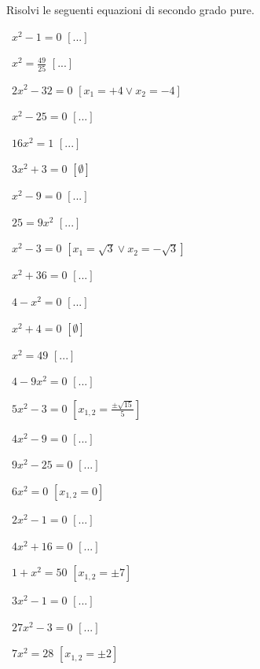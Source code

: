 \begin{esercizio}[\Ast]
 \label{ese:3.1}
Risolvi le seguenti equazioni di secondo grado pure.
\begin{multicols}{2}
 \begin{enumeratea}
 \item~$x^{2}-1 = 0$ \hfill$\left[...\right]$
 \item~$x^{2}=\frac{49}{25}$ \hfill$\left[...\right]$
 \item~$2x^{2} - 32 = 0$ \hfill$\left[x_{1}=+4 \vee x_{2}=-4\right]$
 \item~$x^{2}-25=0$ \hfill$\left[...\right]$
 \item~$16 x^{2}=1$ \hfill$\left[...\right]$
 \item~$3x^{2}+3=0$ \hfill$\left[\emptyset\right]$
 \item~$x^{2}-9=0$ \hfill$\left[...\right]$
 \item~$25=9 x^{2}$ \hfill$\left[...\right]$
 \item~$x^{2} - 3 = 0$ \hfill$\left[x_{1} = \sqrt{3} \vee x _{2} = - \sqrt{3}\right]$
 \item~$x^{2} + 36 = 0$ \hfill$\left[...\right]$
 \item~$4 - x^{2} = 0$ \hfill$\left[...\right]$
 \item~$x^{2} + 4 = 0$ \hfill$\left[\emptyset\right]$
 \item~$x^{2} = 49$ \hfill$\left[...\right]$
 \item~$4 - 9 x^{2} = 0$ \hfill$\left[...\right]$
 \item~$5 x^{2} - 3 = 0$ \hfill$\left[x_{1,2} = \frac{\pm \sqrt{15}}{5}\right]$
 \item~$4 x^{2} - 9 = 0$ \hfill$\left[...\right]$
 \item~$9 x^{2} - 25 = 0$ \hfill$\left[...\right]$
 \item~$6 x^{2} = 0$ \hfill$\left[x_{1,2} = 0\right]$
 \item~$2 x^{2} - 1 = 0$ \hfill$\left[...\right]$
 \item~$4 x^{2} + 16 = 0$ \hfill$\left[...\right]$
 \item~$1 + x^{2} = 50$ \hfill$\left[x_{1,2} = \pm 7\right]$
 \item~$3 x^{2} - 1 = 0$ \hfill$\left[...\right]$
 \item~$27 x^{2} - 3 = 0$ \hfill$\left[...\right]$
 \item~$7 x^{2} = 28$ \hfill$\left[x_{1,2} = \pm 2\right]$
 \end{enumeratea}
 \end{multicols}
\end{esercizio}

